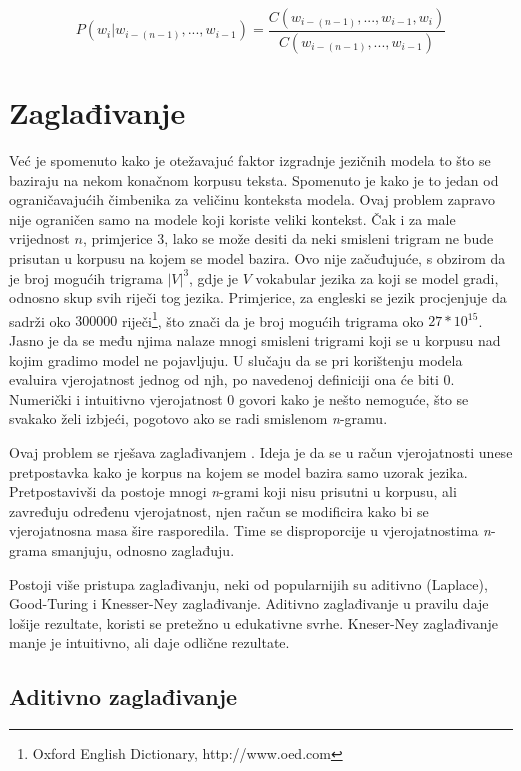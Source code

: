 \documentclass[times, utf8, diplomski, numeric]{fer}
\begin{document}
\begin{equation}
P(w_i | w_{i - (n - 1)}, ... , w_{i - 1}) = \frac{C(w_{i - (n - 1)}, ... , w_{i - 1}, w_i)}{C(w_{i - (n - 1)}, ... , w_{i - 1})}
\end{equation}

\section{Zaglađivanje}

Već je spomenuto kako je otežavajuć faktor izgradnje jezičnih modela to što se baziraju na nekom konačnom korpusu teksta. Spomenuto je kako je to jedan od ograničavajućih čimbenika za veličinu konteksta modela. Ovaj problem zapravo nije ograničen samo na modele koji koriste veliki kontekst. Čak i za male vrijednost $n$, primjerice 3, lako se može desiti da neki smisleni trigram ne bude prisutan u korpusu na kojem se model bazira. Ovo nije začuđujuće, s obzirom da je broj mogućih trigrama $|V|^3$, gdje je $V$ vokabular jezika za koji se model gradi, odnosno skup svih riječi tog jezika. Primjerice, za engleski se jezik procjenjuje da sadrži oko $300 000$ riječi\footnote{Oxford English Dictionary, http://www.oed.com}, što znači da je broj mogućih trigrama oko $27 * 10^{15}$. Jasno je da se među njima nalaze mnogi smisleni trigrami koji se u korpusu nad kojim gradimo model ne pojavljuju. U slučaju da se pri korištenju modela evaluira vjerojatnost jednog od njh, po navedenoj definiciji ona će biti 0. Numerički i intuitivno vjerojatnost 0 govori kako je nešto nemoguće, što se svakako želi izbjeći, pogotovo ako se radi smislenom \textit{n}-gramu.

Ovaj problem se rješava zaglađivanjem . Ideja je da se u račun vjerojatnosti unese pretpostavka kako je korpus na kojem se model bazira samo uzorak jezika. Pretpostavivši da postoje mnogi \textit{n}-grami koji nisu prisutni u korpusu, ali zavređuju određenu vjerojatnost, njen račun se modificira kako bi se vjerojatnosna masa šire rasporedila. Time se disproporcije u vjerojatnostima \textit{n}-grama smanjuju, odnosno zaglađuju.

Postoji više pristupa zaglađivanju, neki od popularnijih su aditivno (Laplace), Good-Turing i Knesser-Ney zaglađivanje. Aditivno zaglađivanje u pravilu daje lošije rezultate, koristi se pretežno u edukativne svrhe. Kneser-Ney zaglađivanje manje je intuitivno, ali daje odlične rezultate.

\subsection{Aditivno zaglađivanje}
\end{document}
